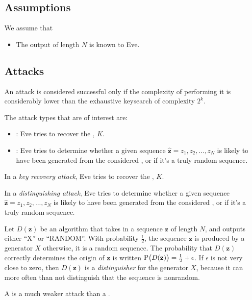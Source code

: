 \subsection{Assumptions}\label{subsec:Stream_Cipher_Assumptions}
We assume that
\begin{itemize}[noitemsep]
\item The output  of length $N$ is known to Eve.
\end{itemize}

\subsection{Attacks}\label{subsec:Stream_Cipher_Attacks}
An attack is considered successful only if the complexity of performing it is considerably lower than the exhaustive keysearch of complexity $2^{k}$.

The attack types that are of interest are:
\begin{itemize}[noitemsep]
\item \emph{}: Eve tries to recover the , $K$.
\item \emph{}: Eve tries to determine whether a given sequence $\hat{\mathbf{z}} = z_{1}, z_{2}, \ldots, z_{N}$ is likely to have been generated from the considered , or if it's a truly random sequence.
\end{itemize}

\begin{definition}\label{def:Attack-Key_Recovery}
  In a \emph{key recovery attack}, Eve tries to recover the , $K$.
\end{definition}

\begin{definition}\label{def:Attack-Distinguishing}
  In a \emph{distinguishing attack}, Eve tries to determine whether a given sequence $\hat{\mathbf{z}} = z_{1}, z_{2}, \ldots, z_{N}$ is likely to have been generated from the considered , or if it's a truly random sequence.

  Let $D(\mathbf{z})$ be an algorithm that takes in a sequence $\mathbf{z}$ of length $N$, and outputs either ``X'' or ``RANDOM''.
  With probability $\frac{1}{2}$, the sequence $\mathbf{z}$ is produced by a generator $X$ otherwise, it is a random sequence.
  The probability that $D(\mathbf{z})$ correctly determines the origin of $\mathbf{z}$ is written $\operatorname{\operatorname{P}} \bigl( D(\mathbf{z}) \bigr) = \frac{1}{2} + \epsilon$.
  If $\epsilon$ is not very close to zero, then $D(\mathbf{z})$ is a \emph{distinguisher} for the generator $X$, because it can more often than not distinguish that the sequence is nonrandom.

  \begin{remark}
    A  is a much weaker attack than a .
  \end{remark}
\end{definition}

